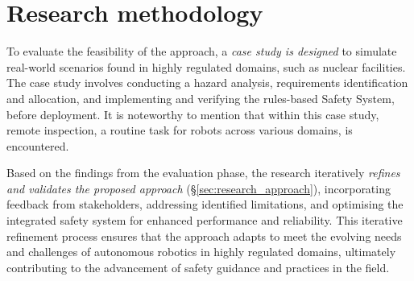 \documentclass[conference]{IEEEtran}
\newcommand{\louisenote}[1]{\todo[color=green!65]{Louise: #1}}
\begin{document}
\section{Research methodology}
\label{sec:resmethod}



To evaluate the feasibility of the approach, a \textit{case study is designed} to simulate real-world scenarios found in highly regulated domains, such as nuclear facilities. The case study involves conducting a hazard analysis, requirements identification and allocation, and implementing and verifying the rules-based Safety System, before deployment. It is noteworthy to mention that within this case study, remote inspection, a routine task for robots across various domains, is encountered.


Based on the findings from the evaluation phase, the research iteratively \textit{refines and validates the proposed approach} (\S \ref{sec:research_approach}), incorporating feedback from stakeholders, addressing identified limitations, and optimising the integrated safety system for enhanced performance and reliability. This iterative refinement process ensures that the approach adapts to meet the evolving needs and challenges of autonomous robotics in highly regulated domains, ultimately contributing to the advancement of safety guidance and practices in the field.
\end{document}
